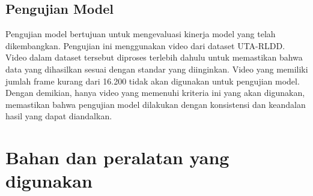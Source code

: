 \subsection{Pengujian Model}
Pengujian model bertujuan untuk mengevaluasi kinerja model yang telah dikembangkan. Pengujian ini menggunakan video dari dataset UTA-RLDD. Video dalam dataset tersebut diproses terlebih dahulu untuk memastikan bahwa data yang dihasilkan sesuai dengan standar yang diinginkan. Video yang memiliki jumlah frame kurang dari 16.200 tidak akan digunakan untuk pengujian model. Dengan demikian, hanya video yang memenuhi kriteria ini yang akan digunakan, memastikan bahwa pengujian model dilakukan dengan konsistensi dan keandalan hasil yang dapat diandalkan.





\section{Bahan dan peralatan yang digunakan}
\label{sec:bahanalat}

